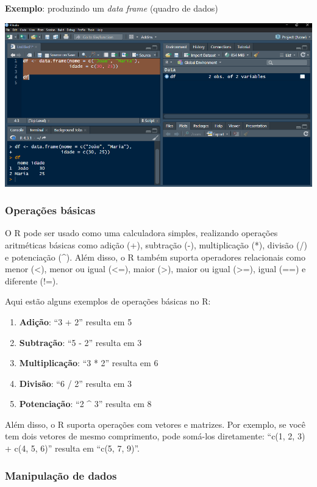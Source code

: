 \documentclass[
]{book}
\begin{document}
\textbf{Exemplo}: produzindo um \emph{data frame} (quadro de dados)

\includegraphics{images/clipboard-3472985925.png}

\subsubsection{Operações básicas}\label{operauxe7uxf5es-buxe1sicas}

O R pode ser usado como uma calculadora simples, realizando operações aritméticas básicas como adição (+), subtração (-), multiplicação (*), divisão (/) e potenciação (\^{}). Além disso, o R também suporta operadores relacionais como menor (\textless), menor ou igual (\textless=), maior (\textgreater), maior ou igual (\textgreater=), igual (==) e diferente (!=).

Aqui estão alguns exemplos de operações básicas no R:

\begin{enumerate}
\def\labelenumi{\arabic{enumi}.}
\item
  \textbf{Adição}: ``3 + 2'' resulta em 5
\item
  \textbf{Subtração}: ``5 - 2'' resulta em 3
\item
  \textbf{Multiplicação}: ``3 * 2'' resulta em 6
\item
  \textbf{Divisão}: ``6 / 2'' resulta em 3
\item
  \textbf{Potenciação}: ``2 \^{} 3'' resulta em 8
\end{enumerate}

Além disso, o R suporta operações com vetores e matrizes. Por exemplo, se você tem dois vetores de mesmo comprimento, pode somá-los diretamente: ``c(1, 2, 3) + c(4, 5, 6)'' resulta em ``c(5, 7, 9)''.

\subsubsection{Manipulação de dados}\label{manipulauxe7uxe3o-de-dados}
\end{document}
